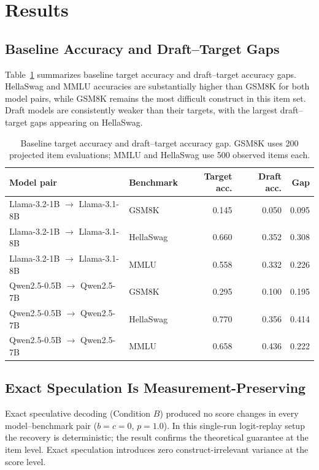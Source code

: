 \documentclass{article}
\begin{document}
\section{Results}

\subsection{Baseline Accuracy and Draft--Target Gaps}

Table~\ref{tab:baseline} summarizes baseline target accuracy and draft--target accuracy gaps. HellaSwag and MMLU accuracies are substantially higher than GSM8K for both model pairs, while GSM8K remains the most difficult construct in this item set. Draft models are consistently weaker than their targets, with the largest draft--target gaps appearing on HellaSwag.

\begin{table}[t]
\centering
\caption{Baseline target accuracy and draft--target accuracy gap. GSM8K uses 200 projected item evaluations; MMLU and HellaSwag use 500 observed items each.}
\label{tab:baseline}
\small
\begin{tabular}{llrrr}
\toprule
Model pair & Benchmark & Target acc. & Draft acc. & Gap \\
\midrule
Llama-3.2-1B $\rightarrow$ Llama-3.1-8B & GSM8K      & 0.145 & 0.050 & 0.095 \\
Llama-3.2-1B $\rightarrow$ Llama-3.1-8B & HellaSwag  & 0.660 & 0.352 & 0.308 \\
Llama-3.2-1B $\rightarrow$ Llama-3.1-8B & MMLU       & 0.558 & 0.332 & 0.226 \\
Qwen2.5-0.5B $\rightarrow$ Qwen2.5-7B   & GSM8K      & 0.295 & 0.100 & 0.195 \\
Qwen2.5-0.5B $\rightarrow$ Qwen2.5-7B   & HellaSwag  & 0.770 & 0.356 & 0.414 \\
Qwen2.5-0.5B $\rightarrow$ Qwen2.5-7B   & MMLU       & 0.658 & 0.436 & 0.222 \\
\bottomrule
\end{tabular}
\end{table}

\subsection{Exact Speculation Is Measurement-Preserving}

Exact speculative decoding (Condition $B$) produced no score changes in every model--benchmark pair ($b=c=0$, $p=1.0$). In this single-run logit-replay setup the recovery is deterministic; the result confirms the theoretical guarantee at the item level. Exact speculation introduces zero construct-irrelevant variance at the score level.
\end{document}
